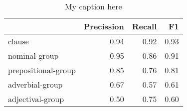 \begin{table}[!ht]
\centering
\begin{tabular}{lrrr}
\toprule
{} &  Precission &  Recall &   F1 \\
\midrule
clause              &        0.94 &    0.92 & 0.93 \\
nominal-group       &        0.95 &    0.86 & 0.91 \\
prepositional-group &        0.85 &    0.76 & 0.81 \\
adverbial-group     &        0.67 &    0.57 & 0.61 \\
adjectival-group    &        0.50 &    0.75 & 0.60 \\
\bottomrule
\end{tabular}
\caption{My caption here}
\label{tab:unit-types-ocd-combined-F1}
\end{table}